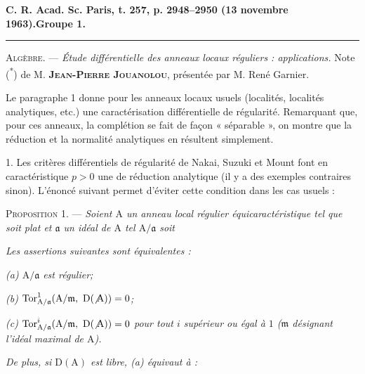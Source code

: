 \textbf{C. R. Acad. Sc. Paris, t. 257, p. 2948--2950 (13 novembre 1963).}\hfill\textbf{Groupe 1.}\par\noindent\rule{\linewidth}{0.4pt}

\textsc{Algèbre.} --- \textit{Étude différentielle des anneaux locaux réguliers : applications.} Note (\textsuperscript{*}) de M. \textbf{\textsc{Jean-Pierre Jouanolou}}, présentée par M. René Garnier.

Le paragraphe 1 donne pour les anneaux locaux usuels (localités, localités analytiques, etc.) une caractérisation différentielle de régularité. Remarquant que, pour ces anneaux, la complétion se fait de façon « séparable », on montre que la réduction et la normalité analytiques en résultent simplement.

1. Les critères différentiels de régularité de Nakai, Suzuki et Mount font  en caractéristique $p>0$  une  de réduction analytique (il y a des exemples contraires sinon). L’énoncé suivant permet d’éviter cette condition dans les cas usuels :

\margin{\handwritten{$\left.\rule{0pt}{7em}\right]$}}\textsc{Proposition 1.} --- \textit{Soient $\mathrm A$ un anneau local régulier équicaractéristique tel que  soit plat et $\mathfrak a$ un idéal de $\mathrm A$ tel $\mathrm A/\mathfrak a$ soit }

\textit{Les assertions suivantes sont équivalentes :}

\textit{(a) $\mathrm A/\mathfrak a$ est régulier;}

\textit{(b) $\operatorname{Tor}^{1}_{\mathrm A/\mathfrak a}(\mathrm A/\mathfrak m,\ \mathrm D(\not\mathrm A))=0$;}

\textit{(c) $\operatorname{Tor}^{i}_{\mathrm A/\mathfrak a}(\mathrm A/\mathfrak m,\ \mathrm D(\not\mathrm A))=0$ pour tout $i$ supérieur ou égal à $1$ ($\mathfrak m$ désignant l’idéal maximal de $\mathrm A$).}

\textit{De plus, si $\mathrm D(\mathrm A)$ est libre, (a) équivaut à :}

